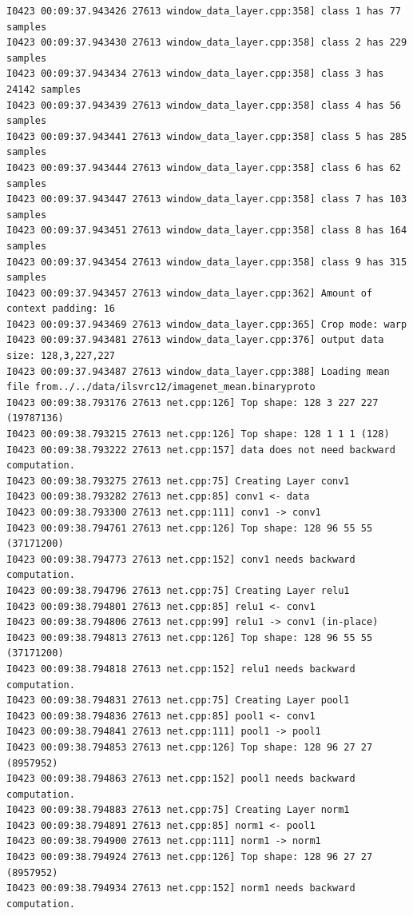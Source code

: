 \documentclass[a4]{article}
\begin{document}
\begin{lstlisting}
I0423 00:09:37.943426 27613 window_data_layer.cpp:358] class 1 has 77 samples
I0423 00:09:37.943430 27613 window_data_layer.cpp:358] class 2 has 229 samples
I0423 00:09:37.943434 27613 window_data_layer.cpp:358] class 3 has 24142 samples
I0423 00:09:37.943439 27613 window_data_layer.cpp:358] class 4 has 56 samples
I0423 00:09:37.943441 27613 window_data_layer.cpp:358] class 5 has 285 samples
I0423 00:09:37.943444 27613 window_data_layer.cpp:358] class 6 has 62 samples
I0423 00:09:37.943447 27613 window_data_layer.cpp:358] class 7 has 103 samples
I0423 00:09:37.943451 27613 window_data_layer.cpp:358] class 8 has 164 samples
I0423 00:09:37.943454 27613 window_data_layer.cpp:358] class 9 has 315 samples
I0423 00:09:37.943457 27613 window_data_layer.cpp:362] Amount of context padding: 16
I0423 00:09:37.943469 27613 window_data_layer.cpp:365] Crop mode: warp
I0423 00:09:37.943481 27613 window_data_layer.cpp:376] output data size: 128,3,227,227
I0423 00:09:37.943487 27613 window_data_layer.cpp:388] Loading mean file from../../data/ilsvrc12/imagenet_mean.binaryproto
I0423 00:09:38.793176 27613 net.cpp:126] Top shape: 128 3 227 227 (19787136)
I0423 00:09:38.793215 27613 net.cpp:126] Top shape: 128 1 1 1 (128)
I0423 00:09:38.793222 27613 net.cpp:157] data does not need backward computation.
I0423 00:09:38.793275 27613 net.cpp:75] Creating Layer conv1
I0423 00:09:38.793282 27613 net.cpp:85] conv1 <- data
I0423 00:09:38.793300 27613 net.cpp:111] conv1 -> conv1
I0423 00:09:38.794761 27613 net.cpp:126] Top shape: 128 96 55 55 (37171200)
I0423 00:09:38.794773 27613 net.cpp:152] conv1 needs backward computation.
I0423 00:09:38.794796 27613 net.cpp:75] Creating Layer relu1
I0423 00:09:38.794801 27613 net.cpp:85] relu1 <- conv1
I0423 00:09:38.794806 27613 net.cpp:99] relu1 -> conv1 (in-place)
I0423 00:09:38.794813 27613 net.cpp:126] Top shape: 128 96 55 55 (37171200)
I0423 00:09:38.794818 27613 net.cpp:152] relu1 needs backward computation.
I0423 00:09:38.794831 27613 net.cpp:75] Creating Layer pool1
I0423 00:09:38.794836 27613 net.cpp:85] pool1 <- conv1
I0423 00:09:38.794841 27613 net.cpp:111] pool1 -> pool1
I0423 00:09:38.794853 27613 net.cpp:126] Top shape: 128 96 27 27 (8957952)
I0423 00:09:38.794863 27613 net.cpp:152] pool1 needs backward computation.
I0423 00:09:38.794883 27613 net.cpp:75] Creating Layer norm1
I0423 00:09:38.794891 27613 net.cpp:85] norm1 <- pool1
I0423 00:09:38.794900 27613 net.cpp:111] norm1 -> norm1
I0423 00:09:38.794924 27613 net.cpp:126] Top shape: 128 96 27 27 (8957952)
I0423 00:09:38.794934 27613 net.cpp:152] norm1 needs backward computation.

\end{lstlisting}
\end{document}
